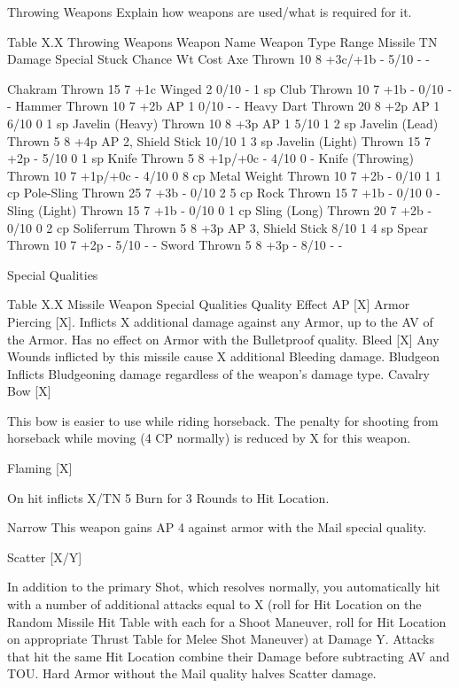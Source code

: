 \documentclass[oneside,11pt,english]{book}
\begin{document}
 

Throwing Weapons 
Explain how weapons are used/what is required for it. 

 
Table X.X Throwing Weapons 
Weapon Name Weapon Type Range Missile TN Damage Special Stuck Chance Wt Cost 
Axe Thrown 10 8 +3c/+1b - 5/10 - - 


Chakram Thrown 15 7 +1c Winged 2 0/10 - 1 sp 
Club Thrown 10 7 +1b - 0/10 - - 
Hammer Thrown 10 7 +2b AP 1 0/10 - - 
Heavy Dart Thrown 20 8 +2p AP 1 6/10 0 1 sp 
Javelin (Heavy) Thrown 10 8 +3p AP 1 5/10 1 2 sp 
Javelin (Lead) Thrown 5 8 +4p AP 2, Shield Stick 10/10 1 3 sp 
Javelin (Light) Thrown 15 7 +2p - 5/10 0 1 sp 
Knife Thrown 5 8 +1p/+0c - 4/10 0 - 
Knife (Throwing) Thrown 10 7 +1p/+0c - 4/10 0 8 cp 
Metal Weight Thrown 10 7 +2b - 0/10 1 1 cp 
Pole-Sling Thrown 25 7 +3b - 0/10 2 5 cp 
Rock Thrown 15 7 +1b - 0/10 0 - 
Sling (Light) Thrown 15 7 +1b - 0/10 0 1 cp 
Sling (Long) Thrown 20 7 +2b - 0/10 0 2 cp 
Soliferrum Thrown 5 8 +3p AP 3, Shield Stick 8/10 1 4 sp 
Spear Thrown 10 7 +2p - 5/10 - - 
Sword Thrown 5 8 +3p - 8/10 - - 

 

Special Qualities 

 
Table X.X Missile Weapon Special Qualities 
Quality Effect 
AP [X] Armor Piercing [X]. Inflicts X additional damage against any Armor, up to the AV of the Armor. Has 
no effect on Armor with the Bulletproof quality. 
Bleed [X] Any Wounds inflicted by this missile cause X additional Bleeding damage. 
Bludgeon Inflicts Bludgeoning damage regardless of the weapon’s damage type. 
Cavalry 
Bow [X] 

This bow is easier to use while riding horseback. The penalty for shooting from horseback while 
moving (4 CP normally) is reduced by X for this weapon. 

Flaming 
[X] 

On hit inflicts X/TN 5 Burn for 3 Rounds to Hit Location. 

Narrow This weapon gains AP 4 against armor with the Mail special quality. 


Scatter 
[X/Y] 

In addition to the primary Shot, which resolves normally, you automatically hit with a number of 
additional attacks equal to X (roll for Hit Location on the Random Missile Hit Table with each for a 
Shoot Maneuver, roll for Hit Location on appropriate Thrust Table for Melee Shot Maneuver) at 
Damage Y. Attacks that hit the same Hit Location combine their Damage before subtracting AV and 
TOU. 
Hard Armor without the Mail quality halves Scatter damage. 
\end{document}
